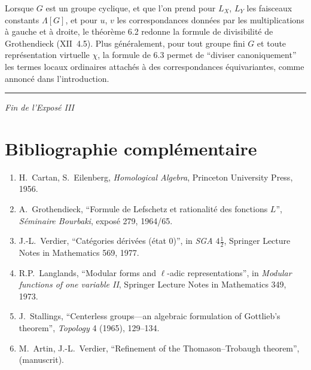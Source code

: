 \begin{para}
Lorsque $G$ est un groupe cyclique, et que l'on prend pour $L_X$, $L_Y$ les faisceaux constants $\Lambda[G]$, et pour $u$, $v$ les correspondances donn\'ees par les multiplications \`a gauche et \`a droite, le th\'eor\`eme 6.2 redonne la formule de divisibilit\'e de Grothendieck (XII~4.5). Plus g\'en\'eralement, pour tout groupe fini $G$ et toute repr\'esentation virtuelle $\chi$, la formule de 6.3 permet de ``diviser canoniquement'' les termes locaux ordinaires attach\'es \`a des correspondances \'equivariantes, comme annonc\'e dans l'introduction.
\end{para}

\vfill

\begin{center}
\rule{0.5\textwidth}{0.4pt}

\textit{Fin de l'Expos\'e III}
\end{center}

\newpage

\section*{Bibliographie compl\'ementaire}

\begin{enumerate}
\item[{[1]}] H.~Cartan, S.~Eilenberg, \textit{Homological Algebra}, Princeton University Press, 1956.

\item[{[2]}] A.~Grothendieck, ``Formule de Lefschetz et rationalit\'e des fonctions $L$'', \textit{S\'eminaire Bourbaki}, expos\'e 279, 1964/65.

\item[{[3]}] J.-L.~Verdier, ``Cat\'egories d\'eriv\'ees (\'etat 0)'', in \textit{SGA $4\frac{1}{2}$}, Springer Lecture Notes in Mathematics 569, 1977.

\item[{[4]}] R.P.~Langlands, ``Modular forms and $\ell$-adic representations'', in \textit{Modular functions of one variable II}, Springer Lecture Notes in Mathematics 349, 1973.

\item[{[5]}] J.~Stallings, ``Centerless groups---an algebraic formulation of Gottlieb's theorem'', \textit{Topology} 4 (1965), 129--134.

\item[{[6]}] M.~Artin, J.-L.~Verdier, ``Refinement of the Thomason--Trobaugh theorem'', (manuscrit).
\end{enumerate}


